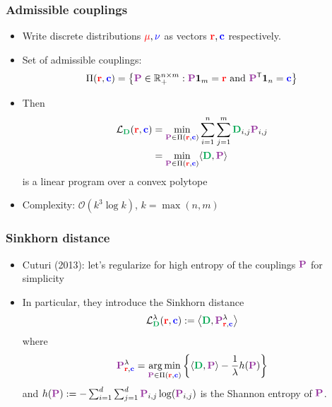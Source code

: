 \documentclass[mathserif,compress,xcolor={dvipsnames}]{beamer}
\newcommand*\reals{\mathbb{R}}
\newcommand*\ba{\[ \begin{aligned}}
\newcommand*\ea{\end{aligned} \]}
\newcommand*\set[1]{\left\{#1\right\}}
\DeclareMathOperator*{\argmin}{arg\;min}
\renewcommand\;{\,}
\begin{document}
\begin{frame}\frametitle{Admissible couplings}
\begin{itemize}
\item
Write discrete distributions ${\color{red} \mu}, {\color{blue} \nu}$ as vectors ${\color{red} \mathbf r}, {\color{blue} \mathbf c}$ respectively.
\bigskip
\item
Set of admissible couplings:
\ba
\Pi({\color{red} \mathbf r}, {\color{blue} \mathbf c}) 
	= \set{ {\color{Purple} \mathbf P} \in \reals_+^{n \times m} : 
	\mathbf {\color{Purple} \mathbf P} \mathbf{1}_m = {\color{red} \mathbf r} \text{ and }
	\mathbf {\color{Purple} \mathbf P}^\mathsf{T} \mathbf{1}_n = {\color{blue} \mathbf c} }
\ea
\item Then
\begin{align}
\mathcal L_{{\color{Green} \mathbf D}}(
		{\color{red} \mathbf r}, {\color{blue} \mathbf c})
	& = \min_{{\color{Purple} \mathbf P} \in \Pi({\color{red} \mathbf r} , {\color{blue} \mathbf c})}
		\sum_{i=1}^n \sum_{j=1}^m \mathbf {\color{Green} D}_{i,j} \mathbf {\color{Purple} \mathbf P}_{i,j} \\
	& = \min_{{\color{Purple} \mathbf P} \in \Pi({\color{red} \mathbf r} , {\color{blue} \mathbf c})} 
		\langle \mathbf {\color{Green} D}, {\color{Purple} \mathbf P} \rangle 
\end{align}
is a linear program over a convex polytope
\medskip
\item
Complexity: $\mathcal O(k^3 \log k)$, $k = \max(n, m)$  \Sadey
\end{itemize}
\end{frame}

\begin{frame}\frametitle{Sinkhorn distance}
\begin{itemize}
\item
Cuturi (2013): let's regularize for high entropy of the couplings ${\color{Purple} \mathbf P}$ for simplicity
\bigskip
\item
In particular, they introduce the Sinkhorn distance 
\begin{align}
\mathcal L_{{\color{Green} \mathbf D}}^\lambda(
		{\color{red} \mathbf r}, {\color{blue} \mathbf c})
	:= \left\langle {\color{Green} \mathbf D}, {\color{Purple} \mathbf P}_{{\color{red} \mathbf r}, {\color{blue} \mathbf c}}^\lambda \right\rangle
\end{align}
where
\begin{align}
{\color{Purple} \mathbf P}_{{\color{red} \mathbf r}, {\color{blue} \mathbf c}}^\lambda 
= \argmin_{{\color{Purple} \mathbf P} \in \Pi({\color{red} \mathbf r} , {\color{blue} \mathbf c})}
	\left\{ \langle {\color{Green} \mathbf D}, {\color{Purple} \mathbf P} \rangle - \frac{1}{\lambda} h({\color{Purple} \mathbf P}) \right\}
\end{align}
and $h({\color{Purple} \mathbf P}) 
	:= - \sum_{i=1}^d \sum_{j=1}^d {\color{Purple} \mathbf P}_{i,j} \log({\color{Purple} \mathbf P}_{i,j})$ is the Shannon entropy of ${\color{Purple} \mathbf P}$.
\end{itemize}
\end{frame}
\end{document}
